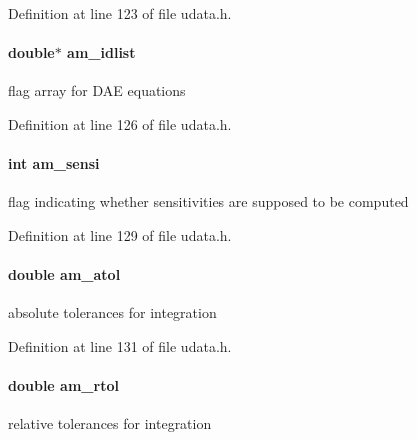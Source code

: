 Definition at line 123 of file udata.\+h.

\hypertarget{struct_user_data_ab62bd78b1593ddbf3d854356b4dcaa0f}{}
\paragraph[{am\+\_\+idlist}]{\setlength{\rightskip}{0pt plus 5cm}double$\ast$ am\+\_\+idlist}\label{struct_user_data_ab62bd78b1593ddbf3d854356b4dcaa0f}
flag array for D\+A\+E equations 

Definition at line 126 of file udata.\+h.

\hypertarget{struct_user_data_a3bd631d595b8a864de83f25a1756ce3d}{}
\paragraph[{am\+\_\+sensi}]{\setlength{\rightskip}{0pt plus 5cm}int am\+\_\+sensi}\label{struct_user_data_a3bd631d595b8a864de83f25a1756ce3d}
flag indicating whether sensitivities are supposed to be computed 

Definition at line 129 of file udata.\+h.

\hypertarget{struct_user_data_a2aade90998d7e2cefa7953d4fdbc438b}{}
\paragraph[{am\+\_\+atol}]{\setlength{\rightskip}{0pt plus 5cm}double am\+\_\+atol}\label{struct_user_data_a2aade90998d7e2cefa7953d4fdbc438b}
absolute tolerances for integration 

Definition at line 131 of file udata.\+h.

\hypertarget{struct_user_data_a2370b78f280747d84a69619ea8c55985}{}
\paragraph[{am\+\_\+rtol}]{\setlength{\rightskip}{0pt plus 5cm}double am\+\_\+rtol}\label{struct_user_data_a2370b78f280747d84a69619ea8c55985}
relative tolerances for integration 

